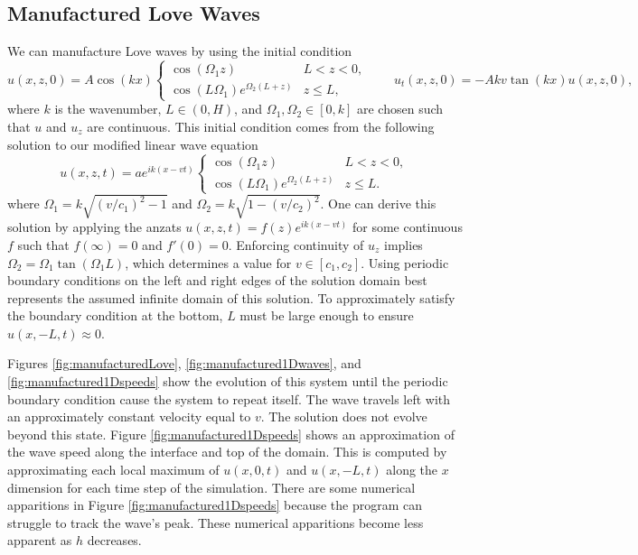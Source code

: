 \documentclass[11pt,letter,subeqn,fleqn]{article}
\numberwithin{equation}{section}
\numberwithin{table}{section}
\numberwithin{figure}{section}
\begin{document}
\subsection{Manufactured Love Waves}
\label{sec:numerical_manufactured}

We can manufacture Love waves by using the initial condition
\[
	u(x,z,0) = A\cos(kx)
	\begin{cases}
		\cos(\Omega_1z)                  & L < z < 0,    \\
		\cos(L\Omega_1)e^{\Omega_2(L+z)} & z \leq L,
	\end{cases}
	\qquad
	u_t(x,z,0) = -Akv\tan(kx)u(x,z,0),
\]
where $k$ is the wavenumber, $L\in(0,H)$, and $\Omega_1,\Omega_2\in[0,k]$ are chosen such that $u$ and $u_z$ are continuous.
This initial condition comes from the following solution to our modified linear wave equation
\[
	u(x,z,t) = ae^{ik(x-vt)}
	\begin{cases}
		\cos(\Omega_1z)                  & L < z < 0,    \\
		\cos(L\Omega_1)e^{\Omega_2(L+z)} & z \leq L.
	\end{cases}
\]
where $\Omega_1 = k\sqrt{(v/c_1)^2-1}$ and $\Omega_2 = k\sqrt{1-(v/c_2)^2}$. One can derive this solution by applying
the anzats $u(x,z,t) = f(z)e^{ik(x-vt)}$ for some continuous $f$ such that $f(\infty) = 0$ and $f'(0)=0$.
Enforcing continuity of $u_z$ implies $\Omega_2 = \Omega_1\tan(\Omega_1L)$, which determines a value for
$v\in[c_1,c_2]$. Using periodic boundary conditions on the left and right edges of the solution domain
best represents the assumed infinite domain of this solution. To approximately satisfy the boundary condition
at the bottom, $L$ must be large enough to ensure $u(x,-L,t)\approx0$.

Figures \ref{fig:manufacturedLove}, \ref{fig:manufactured1Dwaves}, and \ref{fig:manufactured1Dspeeds} show the evolution
of this system until the periodic boundary condition cause the system to repeat itself. The wave travels left with an
approximately constant velocity equal to $v$. The solution does not evolve beyond this state. Figure \ref{fig:manufactured1Dspeeds}
shows an approximation of the wave speed along the interface and top of the domain. This is computed by approximating each
local maximum of $u(x,0,t)$ and $u(x,-L,t)$ along the $x$ dimension for each time step of the simulation.
There are some numerical apparitions in Figure \ref{fig:manufactured1Dspeeds} because the program can struggle to track
the wave's peak. These numerical apparitions become less apparent as $h$ decreases.
\end{document}
